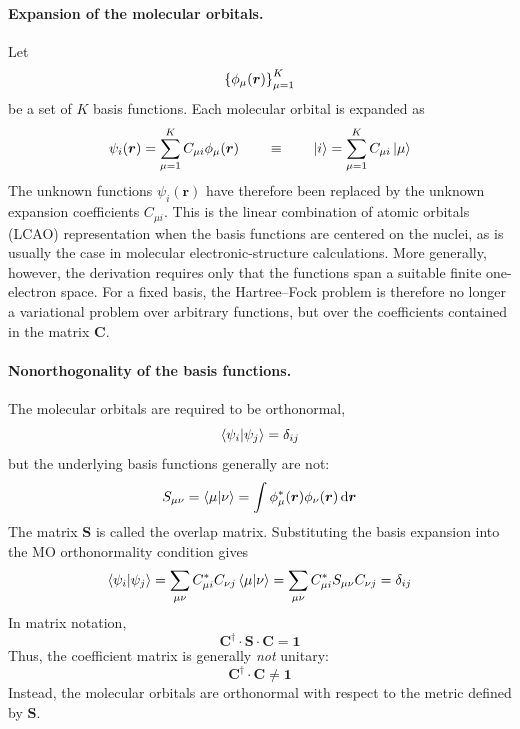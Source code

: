 \documentclass[11pt,a4paper,titlepage]{article}
\numberwithin{equation}{section}
\newcommand{\br}{\boldsymbol{r}}
\newcommand{\bC}{\boldsymbol{C}}
\newcommand{\bI}{\boldsymbol{1}}
\newcommand{\bS}{\boldsymbol{S}}
\begin{document}
\paragraph{Expansion of the molecular orbitals.}

Let
\begin{equation}
  \qty{
    \phi_\mu(\br)
  }_{\mu=1}^{K}
\end{equation}
be a set of $K$ basis functions. Each molecular orbital is expanded as
\begin{equation}
  \psi_i(\br)
  =
  \sum_{\mu=1}^{K}
  C_{\mu i}\phi_\mu(\br)
  \qquad
  \equiv
  \qquad
  \ket{i}
  =
  \sum_{\mu=1}^{K}
  C_{\mu i}\ket{\mu}
  \label{eq:lcao-expansion}
\end{equation}
The unknown functions $\psi_i(\br)$ have therefore been replaced by the
unknown expansion coefficients $C_{\mu i}$.
This is the linear combination of atomic orbitals (LCAO)
representation when the basis functions are centered on the nuclei, as is
usually the case in molecular electronic-structure calculations. More
generally, however, the derivation requires only that the functions span a
suitable finite one-electron space.
For a fixed basis, the Hartree--Fock problem is therefore no longer a
variational problem over arbitrary functions, but over the coefficients
contained in the matrix $\bC$.

\paragraph{Nonorthogonality of the basis functions.}

The molecular orbitals are required to be orthonormal,
\begin{equation}
  \braket{\psi_i}{\psi_j}
  =
  \delta_{ij}
\end{equation}
but the underlying basis functions generally are not:
\begin{equation}
  S_{\mu\nu}
  =
  \braket{\mu}{\nu}
  =
  \int
  \phi_\mu^*(\br)
  \phi_\nu(\br)
  \dd{\br}
  \label{eq:ao-overlap}
\end{equation}
The matrix $\bS$ is called the overlap matrix.
Substituting the basis expansion into the MO orthonormality condition gives
\begin{equation}
  \braket{\psi_i}{\psi_j}
  =
  \sum_{\mu\nu}
  C_{\mu i}^*
  C_{\nu j}
  \braket{\mu}{\nu}
  =
  \sum_{\mu\nu}
  C_{\mu i}^*
  S_{\mu\nu}
  C_{\nu j}
  =
  \delta_{ij}
\end{equation}
In matrix notation,
\begin{equation}
  \boxed{
  \bC^\dag\cdot\bS\cdot\bC
  =
  \bI
  }
  \label{eq:mo-orthonormality-matrix}
\end{equation}
Thus, the coefficient matrix is generally \emph{not} unitary:
\begin{equation}
  \bC^\dag\cdot\bC
  \neq
  \bI
\end{equation}
Instead, the molecular orbitals are orthonormal with respect to the
metric defined by $\bS$.
\end{document}
